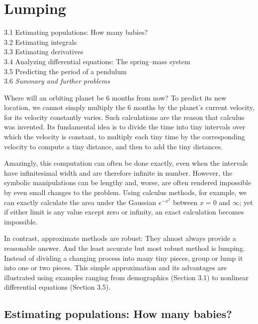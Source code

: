 \documentclass[fleqn,12 pt]{book}
\newcounter{pro1}
\begin{document}
\chapter{Lumping}
\colorbox{light-gray}{
\begin{minipage}{\textwidth}
3.1 Estimating populations: How many babies?\\
3.2 Estimating integrals\\
3.3 Estimating derivatives\\
3.4 Analyzing differential equations: The spring–mass system\\
3.5 Predicting the period of a pendulum\\
3.6 \textit{Summary and further problems}
\end{minipage}}
\par\bigskip
\noindent
Where will an orbiting planet be 6 months from now?
To predict its new location, we cannot simply multiply the 6 months by the planet’s current velocity, for its velocity constantly varies.
Such calculations are the reason that calculus was invented.
Its fundamental idea is to divide the time into tiny intervals over which the velocity is constant, to multiply each tiny time by the corresponding velocity to compute a tiny distance, and then to add the tiny distances.

\noindent
Amazingly, this computation can often be done exactly, even when the intervals have infinitesimal width and are therefore infinite in number.
However, the symbolic manipulations can be lengthy and, worse, are often rendered impossible by even small changes to the problem.
Using calculus methods, for example, we can exactly calculate the area under the Gaussian $e^{-x^2}$ between $x=0$ and $\infty$; yet if either limit is any value except zero or infinity, an exact calculation becomes impossible.

\noindent
In contrast, approximate methods are robust: They almost always provide a reasonable answer.
And the least accurate but most robust method is lumping.
Instead of dividing a changing process into many tiny pieces, group or lump it into one or two pieces.
This simple approximation and its advantages are illustrated using examples ranging from demographics (Section 3.1) to nonlinear differential equations (Section 3.5).\newpage
\section{{\small Estimating populations: How many babies?}}
\end{document}
